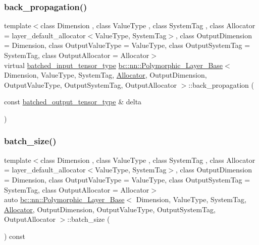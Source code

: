 \subsubsection{\texorpdfstring{back\+\_\+propagation()}{back\_propagation()}\hspace{0.1cm}{\footnotesize\ttfamily [2/2]}}
{\footnotesize\ttfamily template$<$class Dimension , class Value\+Type , class System\+Tag , class Allocator  = layer\+\_\+default\+\_\+allocator$<$\+Value\+Type, System\+Tag$>$, class Output\+Dimension  = Dimension, class Output\+Value\+Type  = Value\+Type, class Output\+System\+Tag  = System\+Tag, class Output\+Allocator  = Allocator$>$ \\
virtual \hyperlink{structbc_1_1nn_1_1Polymorphic__Layer__Base_ae694b03dd73923ff973b0d2c9156e161}{batched\+\_\+input\+\_\+tensor\+\_\+type} \hyperlink{structbc_1_1nn_1_1Polymorphic__Layer__Base}{bc\+::nn\+::\+Polymorphic\+\_\+\+Layer\+\_\+\+Base}$<$ Dimension, Value\+Type, System\+Tag, \hyperlink{classbc_1_1allocators_1_1Allocator}{Allocator}, Output\+Dimension, Output\+Value\+Type, Output\+System\+Tag, Output\+Allocator $>$\+::back\+\_\+propagation (\begin{DoxyParamCaption}\item[{const \hyperlink{structbc_1_1nn_1_1Polymorphic__Layer__Base_a45ed57549be9c4e5c40c52168ca15ae9}{batched\+\_\+output\+\_\+tensor\+\_\+type} \&}]{delta }\end{DoxyParamCaption})\hspace{0.3cm}{\ttfamily [pure virtual]}}

\mbox{\label{structbc_1_1nn_1_1Polymorphic__Layer__Base_a107ffea414142eb7be7aa45f0387f966}} 
\subsubsection{\texorpdfstring{batch\+\_\+size()}{batch\_size()}\hspace{0.1cm}{\footnotesize\ttfamily [1/2]}}
{\footnotesize\ttfamily template$<$class Dimension , class Value\+Type , class System\+Tag , class Allocator  = layer\+\_\+default\+\_\+allocator$<$\+Value\+Type, System\+Tag$>$, class Output\+Dimension  = Dimension, class Output\+Value\+Type  = Value\+Type, class Output\+System\+Tag  = System\+Tag, class Output\+Allocator  = Allocator$>$ \\
auto \hyperlink{structbc_1_1nn_1_1Polymorphic__Layer__Base}{bc\+::nn\+::\+Polymorphic\+\_\+\+Layer\+\_\+\+Base}$<$ Dimension, Value\+Type, System\+Tag, \hyperlink{classbc_1_1allocators_1_1Allocator}{Allocator}, Output\+Dimension, Output\+Value\+Type, Output\+System\+Tag, Output\+Allocator $>$\+::batch\+\_\+size (\begin{DoxyParamCaption}{ }\end{DoxyParamCaption}) const\hspace{0.3cm}{\ttfamily [inline]}}

